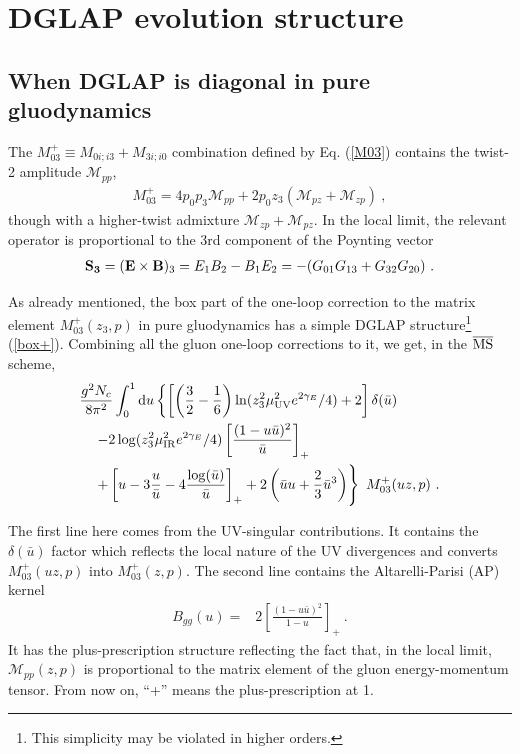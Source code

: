 \section{DGLAP evolution structure}

\subsection{When DGLAP is diagonal in pure gluodynamics}

The $M_{03} ^+\equiv
{ M}_{0 i; i 3} + { M}_{3 i;i 0}$ combination defined by Eq. (\ref{M03}) contains the twist-2 amplitude $\mathcal{M}_{pp}$,
\begin{align}
M_{03} ^+
= 4 p_0 p_3 \mathcal{M}_{pp} +
2 p_0 z_3 \left ( \mathcal{M}_{pz} +\mathcal{M}_{zp} \right) \ ,
\end{align}
though with a higher-twist admixture \mbox{$\mathcal{M}_{zp}+ \mathcal{M}_{pz}$}.
In the local limit, the relevant operator is proportional to the 3rd component of the Poynting vector
\begin{align*}
{\bf S_3}=
({\bf E \times B})_3 =E_1 B_2- B_1 E_2 =-( G_{01} G_{13} +G_{32} G_{20}) \ .
\end{align*}

As already mentioned, the box part of the one-loop correction to the matrix element
$M_{03} ^+(z_3,p)$
in pure gluodynamics
has a simple DGLAP structure\footnote{This simplicity may be violated in higher orders.} (\ref{box+}).
Combining all the gluon one-loop corrections to it,
we get, in the $\overline{\rm MS}$ scheme,
\begin{align}
& \frac{g^2N_c}{8\pi^2}\int_0^1 \mathrm{d} u
\left\{ \left[ \left (\frac{3}{2} -\frac16 \right ) \ln(z_3^2 \mu_{\rm UV}^2 e^{2\gamma_E}/4) +2 \right] \delta(\bar u) \right. \nonumber \\
&\quad \left. - 2 \log(z_3^2 \mu_{\rm IR}^2 e^{2\gamma_E}/4) \left [ \frac{(1- u \bar u)^2}{\bar u} \right ]_+ \right.
\label{M031L} \\
&\quad \left. + \left [ u -3 \frac{u}{\bar u} -4 \frac{\log (\bar u)}{\bar u} \right ]_+
+ 2 \left (\bar uu + \frac{2}{3}\bar u^3 \right ) \right\} \ M_{03} ^+(uz,p) \ .\nonumber
\end{align}

The first line here comes from the UV-singular contributions. It contains the $\delta(\bar u)$ factor
which reflects
the local nature of the UV divergences and converts
$M_{03} ^+(uz,p)$ into $M_{03} ^+(z,p)$.
The second line contains the Altarelli-Parisi (AP) kernel
\begin{align}
B_{gg} (u) =&
2 \left [\frac{(1-u\bar u)^2} {1-u} \right ]_{+} \ .
\label{V1}
\end{align}
It has the plus-prescription
structure reflecting the fact that,
in the local limit, ${\mathcal{M}}_{pp}(z,p)$ is proportional to the
matrix element of the gluon energy-momentum tensor.
From now on, ``+'' means the plus-prescription at 1.

